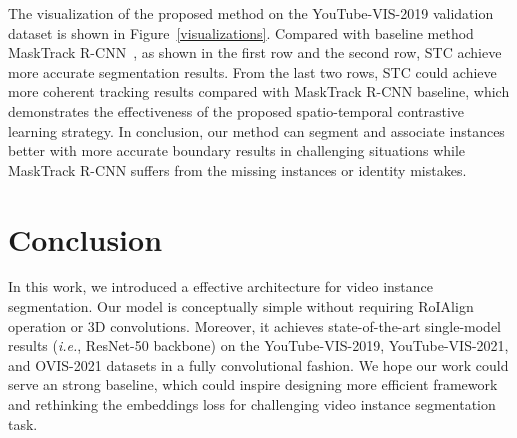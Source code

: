 \documentclass[runningheads]{llncs}
\begin{document}
 The visualization of the proposed method on the YouTube-VIS-2019 validation dataset is shown in Figure~\ref{visualizations}. Compared with baseline method MaskTrack R-CNN~\cite{yang2019video}, as shown in the first row and the second row, STC achieve more accurate segmentation results. From the last two rows, STC could achieve more coherent tracking results compared with MaskTrack R-CNN baseline, which demonstrates the effectiveness of the proposed spatio-temporal contrastive learning strategy. In conclusion, our method can segment and associate instances better with more accurate boundary results in challenging situations while MaskTrack R-CNN suffers from the missing instances or identity mistakes. \section{Conclusion}
In this work, we introduced a effective architecture for video instance segmentation. Our model is conceptually simple without requiring RoIAlign operation or 3D convolutions. Moreover, it achieves state-of-the-art single-model results ({\em i.e.}, ResNet-50 backbone) on the YouTube-VIS-2019, YouTube-VIS-2021, and OVIS-2021 datasets in a fully convolutional fashion. We hope our work could serve an strong baseline, which could inspire designing more efficient framework and rethinking the embeddings loss for challenging video instance segmentation task. 

\clearpage


\end{document}
